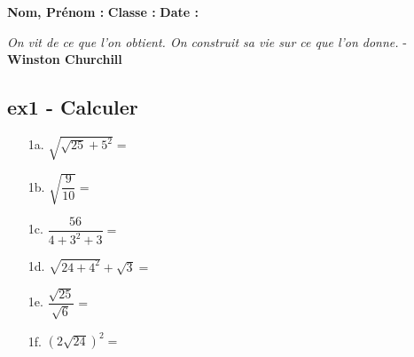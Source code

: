 \documentclass[12pt]{article}
\begin{document}

\newtheorem{Definition}{Définition}
\newtheorem{Theorem}{Théorème}
\newtheorem{Proposition}{Propriété}

\renewcommand{\labelitemi}{$\bullet$}
\renewcommand{\labelitemii}{$\circ$}
\newcommand{\Pointilles}[1][3]{%
  \multido{}{#1}{\makebox[\linewidth]{\dotfill}\\[\parskip]
}}


\setlength{\columnseprule}{1pt}

\textbf{Nom, Prénom :} \hspace{8cm} \textbf{Classe :} \hspace{3cm} \textbf{Date :}\\
\vspace{-0.2cm}
\begin{center}
  \textit{On vit de ce que l’on obtient. On construit sa vie sur ce que l’on donne.}  - \textbf{Winston Churchill}
\end{center}
\vspace{-0.2cm}


\subsection*{ex1 - Calculer}
\begin{multicols}{3}
\begin{enumerate}
\item[1a.] $\sqrt{\sqrt{25} + 5^2} = $ \dotfill\\
\item[1b.] $\sqrt{\dfrac{9}{10}} = $ \dotfill\\
\item[1c.] $\dfrac{56}{4 + 3^2 + 3} = $ \dotfill \\
\item[1d.] $ \sqrt{24 + 4^2} + \sqrt{3} = $ \dotfill\\
\item[1e.] $\dfrac{\sqrt{25}}{\sqrt{6}} = $ \dotfill \\
\item[1f.] $(2\sqrt{24})^2 = $ \dotfill 
\end{enumerate}
\end{multicols}
\end{document}
